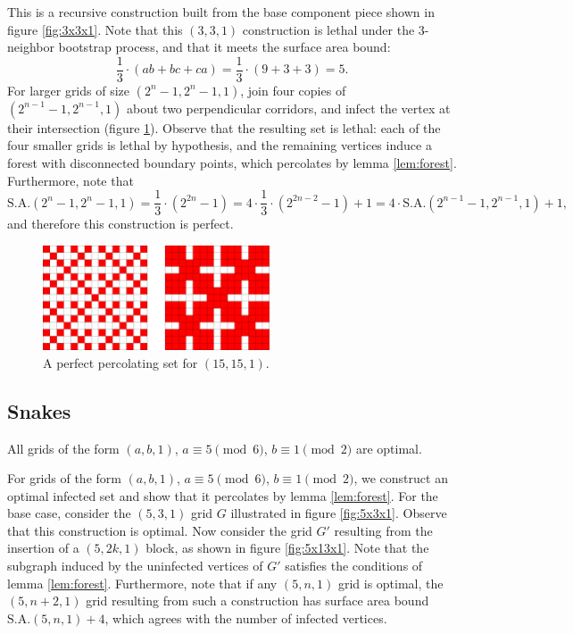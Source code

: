 This is a recursive construction built from the base component piece shown in figure \ref{fig:3x3x1}. Note that this $(3,3,1)$ construction is lethal under the 3-neighbor bootstrap process, and that it meets the surface area bound:
$$\frac{1}{3} \cdot (ab+bc+ca) = \frac{1}{3} \cdot (9 + 3 + 3) = 5.$$
For larger grids of size $(2^n-1, 2^n-1, 1)$, join four copies of $(2^{n-1}-1, 2^{n-1}, 1)$ about two perpendicular corridors, and infect the vertex at their intersection (figure \ref{fig:15x15x1}). Observe that the resulting set is lethal: each of the four smaller grids is lethal by hypothesis, and the remaining vertices induce a forest with disconnected boundary points, which percolates by lemma \ref{lem:forest}. Furthermore, note that
$$\text{S.A.}(2^n-1,2^n-1,1) = \frac{1}{3} \cdot (2^{2n}-1) = 4 \cdot \frac{1}{3} \cdot (2^{2n-2} -1) + 1 = 4 \cdot \text{S.A.}(2^{n-1}-1, 2^{n-1}, 1) + 1,$$
and therefore this construction is perfect.

\begin{figure}[]
\centering
\includegraphics[width=0.6\textwidth]{figures/4/15x15x1.pdf}
\caption{A perfect percolating set for $(15,15,1)$.}
\label{fig:15x15x1}
\end{figure} 

\subsection{Snakes}

\begin{con}
\label{con:snake}
All grids of the form $(a,b,1)$, $a \equiv 5 \pmod 6$, $b \equiv 1 \pmod 2$ are optimal.
\end{con}

For grids of the form $(a,b,1)$, $a \equiv 5 \pmod 6$, $b \equiv 1 \pmod 2$, we construct an optimal infected set and show that it percolates by lemma \ref{lem:forest}. For the base case, consider the $(5,3,1)$ grid $G$ illustrated in figure \ref{fig:5x3x1}. Observe that this construction is optimal. Now consider the grid $G'$ resulting from the insertion of a $(5, 2k, 1)$ block, as shown in figure \ref{fig:5x13x1}. Note that the subgraph induced by the uninfected vertices of $G'$ satisfies the conditions of lemma \ref{lem:forest}. Furthermore, note that if any $(5, n, 1)$ grid is optimal, the $(5,n+2,1)$ grid resulting from such a construction has surface area bound $\text{S.A.}(5,n,1) + 4$, which agrees with the number of infected vertices.

